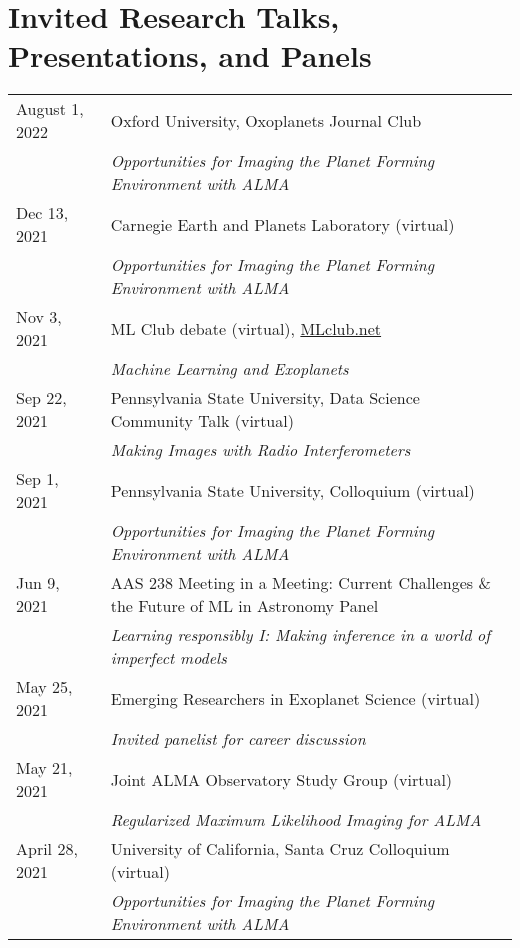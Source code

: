 \section*{Invited Research Talks, Presentations, and Panels}
\setlength\LTleft{0pt}
\setlength\LTright{0pt}
\begin{longtable}{@{\hspace{10pt}}p{1.2in}l}
  August 1, 2022 & Oxford University, Oxoplanets Journal Club\\
  & \emph{Opportunities for Imaging the Planet Forming Environment with ALMA}\\[\rowskip] 
  Dec 13, 2021 & Carnegie Earth and Planets Laboratory (virtual) \\
  & \emph{Opportunities for Imaging the Planet Forming Environment with ALMA} \\[\rowskip]
  Nov 3, 2021 & ML Club debate (virtual), \href{https://docs.google.com/document/d/1GGtE-YIuAWlmpKSr38_kyiF-Fklszhkh4FkiYWzBAho/pub}{MLclub.net} \\
  & \emph{Machine Learning and Exoplanets}\\[\rowskip]
  Sep 22, 2021 & Pennsylvania State University, Data Science Community Talk (virtual)\\
  & \emph{Making Images with Radio Interferometers} \\[\rowskip]
  Sep 1, 2021 & Pennsylvania State University, Colloquium (virtual)\\
  & \emph{Opportunities for Imaging the Planet Forming Environment with ALMA} \\[\rowskip]
  Jun 9, 2021 & AAS 238 Meeting in a Meeting: Current Challenges \& the Future of ML in Astronomy Panel\\
  & \emph{Learning responsibly I: Making inference in a world of imperfect models} \\[\rowskip]
  May 25, 2021 & Emerging Researchers in Exoplanet Science (virtual)\\
  & \emph{Invited panelist for career discussion} \\[\rowskip]
  May 21, 2021 & Joint ALMA Observatory Study Group (virtual)\\
  & \emph{Regularized Maximum Likelihood Imaging for ALMA}\\[\rowskip]
  April 28, 2021 & University of California, Santa Cruz Colloquium (virtual)\\
  & \emph{Opportunities for Imaging the Planet Forming Environment with ALMA} \\[\rowskip]

\end{longtable}

